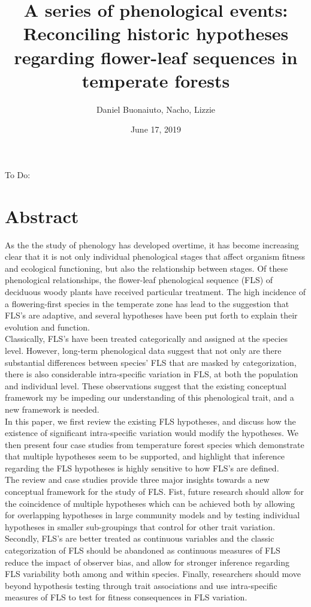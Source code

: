 \documentclass[12pt]{article}\usepackage[]{graphicx}\usepackage[]{color}
\title{A series of phenological events: Reconciling historic hypotheses regarding flower-leaf sequences in temperate forests}
\author{Daniel Buonaiuto, Nacho, Lizzie}
\date{June 17, 2019}
\begin{document}
\maketitle
To Do:
\begin{enumerate}
\end{enumerate}
\section*{Abstract}

\indent\indent As the the study of phenology has developed overtime, it has become increasing clear that it is not only individual phenological stages that affect organism fitness and ecological functioning, but also the relationship between stages. Of these phenological relationships, the flower-leaf phenological sequence (FLS) of deciduous woody plants have received particular treatment. The high incidence of a  flowering-first species in the temperate zone has lead to the suggestion that FLS's are adaptive, and several hypotheses have been put forth to explain their evolution and function. \\
\indent Classically, FLS's have been treated categorically and assigned at the species level. However, long-term phenological data suggest that not only are there substantial differences between species' FLS that are masked by categorization, there is also considerable intra-specific variation in FLS, at both the population and individual level. These observations suggest that the existing conceptual framework my be impeding our understanding of this phenological trait, and a new framework is needed.\\
 In this paper, we first review the existing FLS hypotheses, and discuss how the existence of significant intra-specific variation would modify the hypotheses. We then present four case studies from temperature forest species which demonstrate that multiple hypotheses seem to be supported, and highlight that inference regarding the FLS hypotheses is highly sensitive to how FLS's are defined.\\
\indent The review and case studies provide three major insights towards a new conceptual framework for the study of FLS. Fist, future research should allow for the coincidence of multiple hypotheses which can be achieved both by allowing for overlapping hypotheses in large community models and by testing individual hypotheses in smaller sub-groupings that control for other trait variation.
Secondly, FLS's are better treated as continuous variables and the classic categorization of FLS should be abandoned as continuous measures of FLS reduce the impact of observer bias, and allow for stronger inference regarding FLS variability both among and within species. Finally, researchers should move beyond hypothesis testing through trait associations and use intra-specific measures of FLS to test for fitness consequences in FLS variation.
\end{document}
